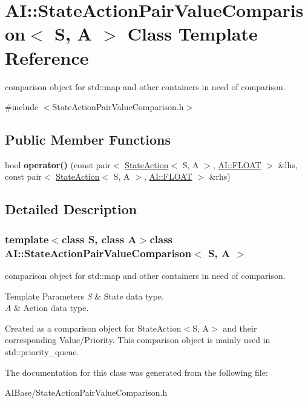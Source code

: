 \hypertarget{classAI_1_1StateActionPairValueComparison}{\section{A\-I\-:\-:State\-Action\-Pair\-Value\-Comparison$<$ S, A $>$ Class Template Reference}
\label{classAI_1_1StateActionPairValueComparison}
}


comparison object for std\-::map and other containers in need of comparison.  




{\ttfamily \#include $<$State\-Action\-Pair\-Value\-Comparison.\-h$>$}

\subsection*{Public Member Functions}
\begin{DoxyCompactItemize}
\item 
\hypertarget{classAI_1_1StateActionPairValueComparison_aa21d4f2cb12071606b09296288094a8e}{bool {\bfseries operator()} (const pair$<$ \hyperlink{classAI_1_1StateAction}{State\-Action}$<$ S, A $>$, \hyperlink{namespaceAI_a41b74884a20833db653dded3918e05c3}{A\-I\-::\-F\-L\-O\-A\-T} $>$ \&lhs, const pair$<$ \hyperlink{classAI_1_1StateAction}{State\-Action}$<$ S, A $>$, \hyperlink{namespaceAI_a41b74884a20833db653dded3918e05c3}{A\-I\-::\-F\-L\-O\-A\-T} $>$ \&rhs)}\label{classAI_1_1StateActionPairValueComparison_aa21d4f2cb12071606b09296288094a8e}

\end{DoxyCompactItemize}


\subsection{Detailed Description}
\subsubsection*{template$<$class S, class A$>$class A\-I\-::\-State\-Action\-Pair\-Value\-Comparison$<$ S, A $>$}

comparison object for std\-::map and other containers in need of comparison. 


\begin{DoxyTemplParams}{Template Parameters}
{\em S} & State data type. \\
\hline
{\em A} & Action data type.\\
\hline
\end{DoxyTemplParams}
Created as a comparison object for State\-Action$<$\-S, A$>$ and their corresponding Value/\-Priority. This comparison object is mainly used in std\-::priority\-\_\-queue. 

The documentation for this class was generated from the following file\-:\begin{DoxyCompactItemize}
\item 
A\-I\-Base/State\-Action\-Pair\-Value\-Comparison.\-h\end{DoxyCompactItemize}
